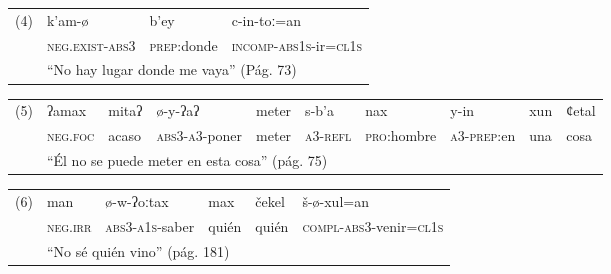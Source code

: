 {      %
      \noindent \begin{tabular}{llll}
            (4) & k'am-ø                                                     & b'ey                & c-in-toː=an                            \\
                & \textsc{neg.exist-abs3}                                    & \textsc{prep}:donde & \textsc{incomp-abs1s}-ir=\textsc{cl1s} \\
                & \multicolumn{3}{l}{“No hay lugar donde me vaya” (Pág. 73)}                                                                \\
      \end{tabular} \vspace{0.25cm}

      \noindent \begin{tabular}{llllllllll}
            (5) & ʔamax                                                             & mitaʔ & ø-y-ʔaʔ                & meter & s-b'a            & nax                 & y-in                & xun & ȼetal \\
                & \textsc{neg.foc}                                                  & acaso & \textsc{abs3-a3}-poner & meter & \textsc{a3-refl} & \textsc{pro}:hombre & \textsc{a3-prep}:en & una & cosa  \\
                & \multicolumn{9}{l}{“Él no se puede meter en esta cosa” (pág. 75)}                                                                                                                       \\
      \end{tabular} \vspace{0.25cm}

      \noindent \begin{tabular}{llllll}
            (6) & man                                               & ø-w-ʔoːtax              & max   & čekel & š-ø-xul=an                              \\
                & \textsc{neg.irr}                                  & \textsc{abs3-a1s}-saber & quién & quién & \textsc{compl-abs3}-venir=\textsc{cl1s} \\
                & \multicolumn{5}{l}{“No sé quién vino” (pág. 181)}                                                                                     \\
      \end{tabular} \vspace{0.25cm}

}
